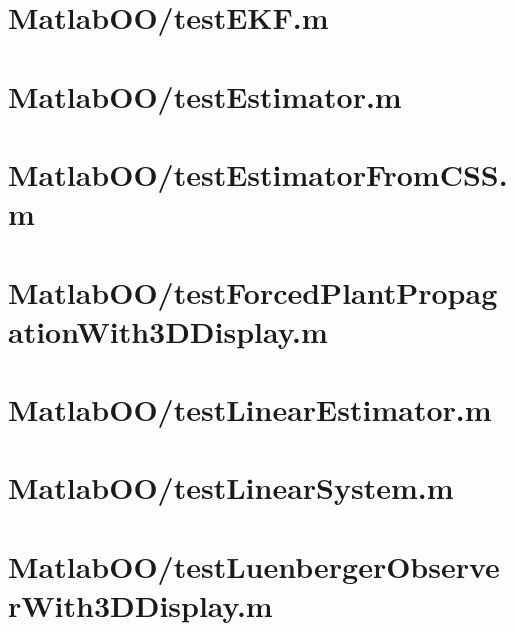 \pagebreak
\section{MatlabOO/testEKF.m}\label{code:MatlabOO/testEKF.m}


\pagebreak
\section{MatlabOO/testEstimator.m}\label{code:MatlabOO/testEstimator.m}


\pagebreak
\section{MatlabOO/testEstimatorFromCSS.m}\label{code:MatlabOO/testEstimatorFromCSS.m}


\pagebreak
\section{MatlabOO/testForcedPlantPropagationWith3DDisplay.m}\label{code:MatlabOO/testForcedPlantPropagationWith3DDisplay.m}


\pagebreak
\section{MatlabOO/testLinearEstimator.m}\label{code:MatlabOO/testLinearEstimator.m}


\pagebreak
\section{MatlabOO/testLinearSystem.m}\label{code:MatlabOO/testLinearSystem.m}


\pagebreak
\section{MatlabOO/testLuenbergerObserverWith3DDisplay.m}\label{code:MatlabOO/testLuenbergerObserverWith3DDisplay.m}



